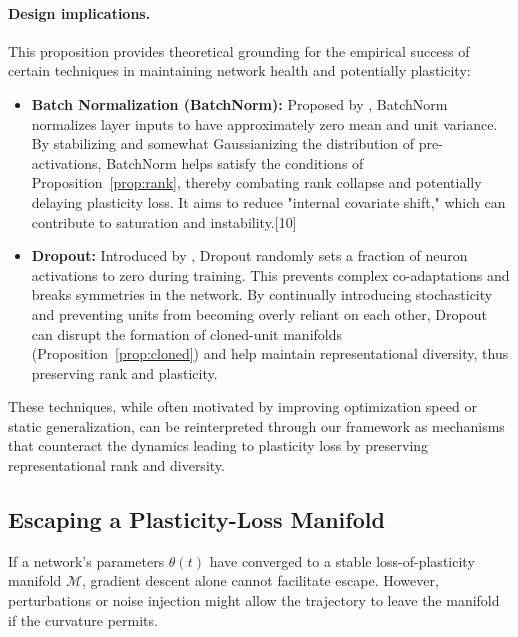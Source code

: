\documentclass{article}
\begin{document}
\paragraph{Design implications.}
This proposition provides theoretical grounding for the empirical success of certain techniques in maintaining network health and potentially plasticity:
\begin{itemize}
    \item \textbf{Batch Normalization (BatchNorm):} Proposed by \cite{ioffe2015batch}, BatchNorm normalizes layer inputs to have approximately zero mean and unit variance. By stabilizing and somewhat Gaussianizing the distribution of pre-activations, BatchNorm helps satisfy the conditions of Proposition~\ref{prop:rank}, thereby combating rank collapse and potentially delaying plasticity loss. It aims to reduce "internal covariate shift," which can contribute to saturation and instability.[10]
    \item \textbf{Dropout:} Introduced by \cite{srivastava2014dropout}, Dropout randomly sets a fraction of neuron activations to zero during training. This prevents complex co-adaptations and breaks symmetries in the network. By continually introducing stochasticity and preventing units from becoming overly reliant on each other, Dropout can disrupt the formation of cloned-unit manifolds (Proposition~\ref{prop:cloned}) and help maintain representational diversity, thus preserving rank and plasticity.
\end{itemize}
These techniques, while often motivated by improving optimization speed or static generalization, can be reinterpreted through our framework as mechanisms that counteract the dynamics leading to plasticity loss by preserving representational rank and diversity.

\subsection{Escaping a Plasticity-Loss Manifold}

If a network's parameters $\theta(t)$ have converged to a stable loss-of-plasticity manifold $\mathcal{M}$, gradient descent alone cannot facilitate escape. However, perturbations or noise injection might allow the trajectory to leave the manifold if the curvature permits.
\end{document}
